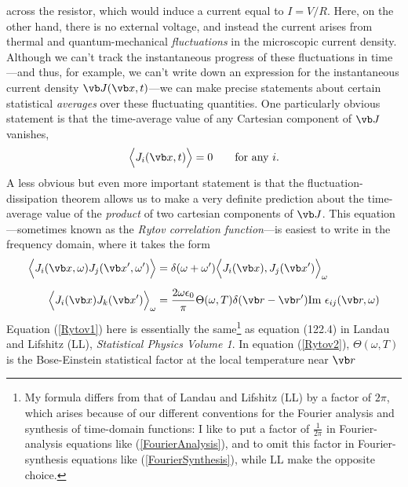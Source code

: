 \documentclass[letterpaper]{article}
\begin{document}
across the resistor, which would induce a current equal to $I=V/R$.
Here, on the other hand, there is no external voltage, and instead
the current arises from thermal and quantum-mechanical 
\textit{fluctuations} in the microscopic current density.
Although we can't track the instantaneous progress of these
fluctuations in time---and thus, for example, we can't write
down an expression for the instantaneous current density 
$\vb J(\vb x, t)$---we can make precise statements about
certain statistical \textit{averages} over these fluctuating
quantities. One particularly obvious statement is that the 
time-average value of any Cartesian component of $\vb J$ vanishes, 
$$\Big\langle J_i(\vb x,t)\Big\rangle=0 \qquad \text{for any } i.$$
A less obvious but even more important statement is that
the fluctuation-dissipation theorem allows us to make a
very definite prediction about the time-average value of the
\textit{product} of two cartesian components of $\vb J$. 
This equation---sometimes known as the \textit{Rytov correlation
function}---is easiest to write in the frequency domain, where
it takes the form
\begin{align}
 \Big\langle  J_i(\vb x, \omega) J_j(\vb x^\prime, \omega^\prime) \Big\rangle
&= \delta(\omega+\omega^\prime)
   \Big\langle J_i(\vb x), J_j(\vb x^\prime) \Big\rangle_\omega
\label{Rytov1}
\\[5pt]
 \Big\langle  J_i(\vb x) J_k(\vb x^\prime) \Big\rangle_{\omega}
&= \frac{2 \omega \epsilon_0}{\pi} \Theta(\omega, T) \delta(\vb r-\vb r^\prime)
   \text{Im }\epsilon_{ij}(\vb r, \omega)
\label{Rytov2}
\end{align}
Equation (\ref{Rytov1}) here is essentially the same\footnote{
My formula differs from that of Landau and Lifshitz (LL) by a 
factor of $2\pi$, which arises because of our different conventions
for the Fourier analysis and synthesis of time-domain functions:
I like to put a factor of $\frac{1}{2\pi}$ in Fourier-analysis 
equations like (\ref{FourierAnalysis}), and to omit this factor 
in Fourier-synthesis equations like (\ref{FourierSynthesis}), while
LL make the opposite choice.} as equation 
(122.4) in Landau and Lifshitz (LL), \textit{Statistical Physics Volume 1}.
In equation (\ref{Rytov2}), $\Theta(\omega, T)$ is the Bose-Einstein 
statistical factor at the local temperature near $\vb r$ 
\end{document}
